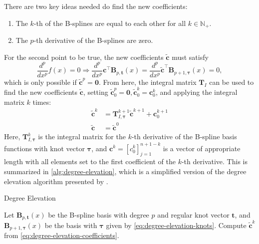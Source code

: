 There are two key ideas needed do find the new coefficients:
\begin{enumerate}
    \item The $k$-th of the B-splines are equal to each other for all $k\in\mathbb{N}_+$.
    \item The $p$-th derivative of the B-splines are zero.
\end{enumerate}
For the second point to be true, the new coefficients $\mathbf{\tilde c}$ must satisfy
\begin{equation}
    \frac{d^p}{dx^p} f(x) = 0 \Rightarrow \frac{d^p}{dx^p} \mathbf{c}^{\top} \mathbf{B}_{p, \mathbf{t}}(x) = 
    \frac{d^p}{dx^p} \mathbf{\tilde c}^{\top} \mathbf{B}_{p+1, \boldsymbol{\tau}}(x) = 0,
\end{equation}
which is only possible if $\mathbf{\tilde c}^p = \mathbf 0$. From here, the integral matrix $\mathbf T_I$ can be used to find the new coefficients $\mathbf{\tilde c}$, setting $\mathbf{\tilde c}_0^p = \mathbf 0, \mathbf{\tilde c}_0^k = \mathbf c_0^k$, and applying the integral matrix $k$ times:
\begin{equation}\label{eq:degree-elevation-coefficients}
    \begin{aligned}
        \mathbf{\tilde c}^k &= \mathbf T^{k+1}_{I,\boldsymbol\tau} \mathbf{\tilde c}^{k+1} + \mathbf{c}_0^{k+1} \\
        \mathbf{\tilde c} &= \mathbf{\tilde c}^0
    \end{aligned}
\end{equation}
Here, $\mathbf T^k_{I,\boldsymbol\tau}$ is the integral matrix for the $k$-th derivative of the B-spline basis functions with knot vector $\boldsymbol\tau$, and $\mathbf{c}^k = [c_0^k]_{j=1}^{n+1-k}$ is a vector of appropriate length with all elements set to the first coefficient of the $k$-th derivative. This is summarized in \cref{alg:degree-elevation}, which is a simplified version of the degree elevation algorithm presented by \cite{lee2000degree}. 

\begin{algorithm}
    \caption{Degree Elevation}\label{alg:degree-elevation}
    \begin{algorithmic}
        \State Let $\mathbf B_{p, \mathbf t}(x)$ be the B-spline basis with degree $p$ and regular knot vector $\mathbf t$, and $\mathbf B_{p+1, \boldsymbol \tau}(x)$ be the basis with $\boldsymbol \tau$ given by \cref{eq:degree-elevation-knots}.
            \State Compute $\mathbf{\tilde c}^k$ from \cref{eq:degree-elevation-coefficients}.
        \EndFor
    \end{algorithmic}
\end{algorithm}

